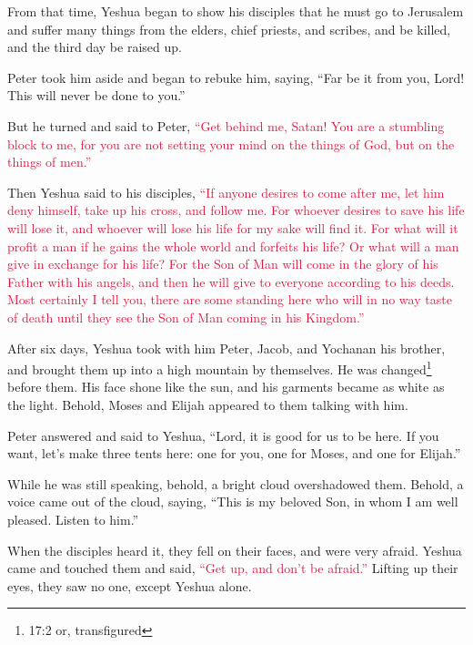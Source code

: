 \myverse{}From that time, Yeshua began to show his disciples that he must
go to Jerusalem and suffer many things from the elders, chief priests, and scribes, and be killed, and
the third day be raised up.

\myverse{}Peter took him aside and began to rebuke him, saying, “Far be
it from you, Lord! This will never be done to you.”

\myverse{}But he turned and said to Peter,
\textcolor{crimson}{“Get behind me, Satan! You are a stumbling block to me, for you are not setting your mind on the things
	of God, but on the things of men.”}

\myverse{}Then Yeshua said to his disciples,
\textcolor{crimson}{“If anyone desires to come after me, let him deny himself, take up his cross, and follow me.
}
\myverse{}\textcolor{crimson}{For whoever desires to save his life will lose it, and whoever will lose
	his life for my sake will find it.
}
\myverse{}\textcolor{crimson}{For what will it profit a man if he gains the whole world and forfeits
	his life? Or what will a man give in exchange for his life?
}
\myverse{}\textcolor{crimson}{For the Son of Man will come in the glory of his Father with his angels,
	and then he will give to everyone according to his deeds.
}
\myverse{}\textcolor{crimson}{Most certainly I tell you, there are some standing here who will in no
	way taste of death until they see the Son of Man coming in his Kingdom.”
}


\mychapter{} \myverse*{}After six days, Yeshua took with him Peter, Jacob, and Yochanan
his brother, and brought them up into a high mountain by themselves.
\myverse{}He was changed\footnote{17:2 or, transfigured} before them. His face shone like the sun, and his garments became as
white as the light.
\myverse{}Behold, Moses and Elijah appeared to them talking with him.

\myverse{}Peter answered and said to Yeshua, “Lord, it is good for us to
be here. If you want, let’s make three tents here: one for you, one for Moses, and one for Elijah.”

\myverse{}While he was still speaking, behold, a bright cloud overshadowed
them. Behold, a voice came out of the cloud, saying, “This is my beloved Son, in whom I am well pleased.
Listen to him.”

\myverse{}When the disciples heard it, they fell on their faces, and were
very afraid.
\myverse{}Yeshua came and touched them and said,
\textcolor{crimson}{“Get up, and don’t be afraid.”
}
\myverse{}Lifting up their eyes, they saw no one, except Yeshua alone.

